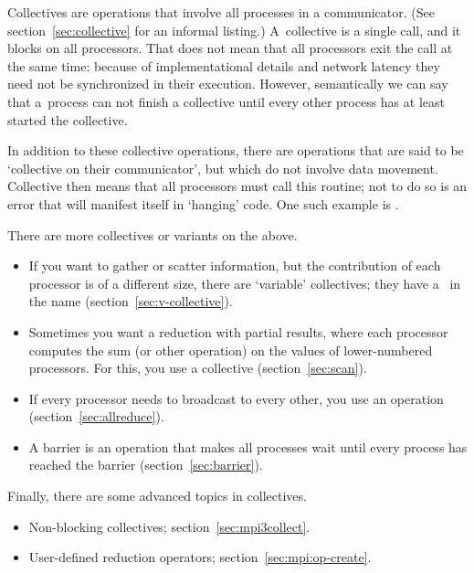 Collectives are operations that involve all processes in a
communicator. (See section~\ref{sec:collective} for an informal listing.)
A~collective is a
single call, and it blocks on all processors.
That does not mean that
all processors exit the call at the same time: because of
implementational details and network
latency they need not be synchronized in their execution.
However, semantically we can say that
a~process can not finish
a collective until every other process has at least started the collective.

In addition to these collective operations, there are operations that
are said to be `collective on their communicator', but which do not
involve data movement. Collective then means that all processors must
call this routine; not to do so is an error that will 
manifest itself in `hanging' code. One such example is
.

There are more collectives or variants on the above.
\begin{itemize}
\item If you want to gather or scatter information, but the contribution
  of each processor is of a different size, there are `variable' collectives;
  they have a~ in the name (section~\ref{sec:v-collective}).
\item Sometimes you want a reduction with partial results, where each processor
  computes the sum (or other operation) on the values of lower-numbered processors.
  For this, you use a  collective (section~\ref{sec:scan}).
\item If every processor needs to broadcast to every other, you use an
   operation (section~\ref{sec:allreduce}).
\item A barrier is an operation that makes all processes wait until every
  process has reached the barrier (section~\ref{sec:barrier}).
\end{itemize}

Finally, there are some advanced topics in collectives.
\begin{itemize}
\item Non-blocking collectives; section~\ref{sec:mpi3collect}.
\item User-defined reduction operators; section~\ref{sec:mpi:op-create}.
\end{itemize}





